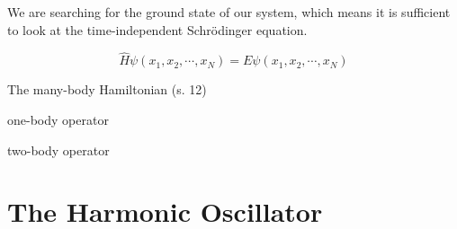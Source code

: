 We are searching for the ground state of our system, which means it is sufficient to look at the time-independent Schrödinger equation.

\begin{equation}
\hat{H} \psi(x_1, x_2, \cdots, x_N) = E \psi (x_1, x_2, \cdots, x_N)
\end{equation}

The many-body Hamiltonian (s. 12) 

one-body operator  

two-body operator

\section{The Harmonic Oscillator}
